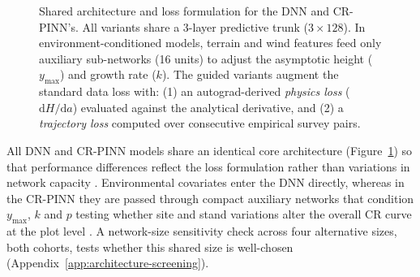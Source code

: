 \begin{figure}[!htbp]
\centering
{}
\caption{Shared architecture and loss formulation for the DNN and CR-PINN's. All variants share a 3-layer predictive trunk ($3 \times 128$). In environment-conditioned models, terrain and wind features feed only auxiliary sub-networks (16 units) to adjust the asymptotic height ($y_{\max}$) and growth rate ($k$). The guided variants augment the standard data loss with: (1) an autograd-derived \emph{physics loss} ($\mathrm{d}H/\mathrm{d}a$) evaluated against the analytical derivative, and (2) a \emph{trajectory loss} computed over consecutive empirical survey pairs.}
\label{fig:model-architecture}
\end{figure}

All DNN and CR-PINN models share an identical core architecture (Figure~\ref{fig:model-architecture}) so that performance differences reflect the loss formulation rather than variations in network capacity \cite{kovacs2022Conditional_C4_NN,miao2023VCPINN_C4_NN}. Environmental covariates enter the DNN directly, whereas in the CR-PINN they are passed through compact auxiliary networks that condition $y_{\max}$, $k$ and $p$ testing whether site and stand variations alter the overall CR curve at the plot level \cite{scolforo2013Dominant_C2_CR}. A network-size sensitivity check across four alternative sizes, both cohorts, tests whether this shared size is well-chosen (Appendix~\ref{app:architecture-screening}). 


